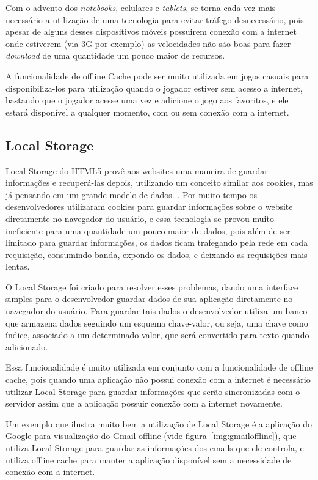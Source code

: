 Com o advento dos \textit{notebooks}, celulares e \textit{tablets},
se torna cada vez mais necessário a utilização de uma tecnologia para
evitar tráfego desnecessário, pois apesar
de alguns desses dispositivos móveis possuirem conexão com a internet
onde estiverem (via 3G por exemplo) as velocidades não são
boas para fazer \textit{download} de uma quantidade um pouco maior de
recursos.

A funcionalidade de offline Cache pode ser muito utilizada em jogos casuais para
disponibiliza-los para utilização quando o jogador estiver sem acesso
a internet, bastando que o jogador acesse uma vez e adicione o jogo aos favoritos,
e ele estará disponível a qualquer momento, com ou sem conexão com a
internet.


\subsection{Local Storage}

Local Storage do HTML5 provê aos websites uma maneira de guardar
informações e recuperá-las depois, utilizando um conceito similar aos
cookies, mas já pensando em um grande modelo de dados. \cite{pilgrim2010html5}.
Por muito tempo os desenvolvedores utilizaram cookies para guardar
informações sobre o website diretamente no navegador do usuário, e
essa tecnologia se provou muito ineficiente para uma quantidade um
pouco maior de dados, pois além de ser limitado para guardar informações,
os dados ficam trafegando pela rede em cada requisição, consumindo
banda, expondo os dados, e deixando as requisições mais lentas.

O Local Storage foi criado para resolver esses problemas, dando uma
interface simples para o desenvolvedor guardar dados de sua
aplicação diretamente no navegador do usuário. Para guardar tais dados
o desenvolvedor utiliza um banco que armazena dados seguindo um
esquema chave-valor, ou seja, uma chave como índice, associado a um
determinado valor, que será convertido para texto quando adicionado.

Essa funcionalidade é muito utilizada em conjunto com a funcionalidade
de offline cache, pois quando uma aplicação não possui conexão com a
internet é necessário utilizar Local Storage para guardar informações
que serão sincronizadas com o servidor assim que a aplicação possuir
conexão com a internet novamente.

Um exemplo que ilustra muito bem a utilização de Local Storage é a
aplicação do Google para visualização do Gmail offline (vide
figura~\ref{img:gmailoffline}), que utiliza Local Storage para guardar
as informações dos emails que ele controla, e utiliza offline cache
para manter a aplicação disponível sem a necessidade de conexão com a
internet.

